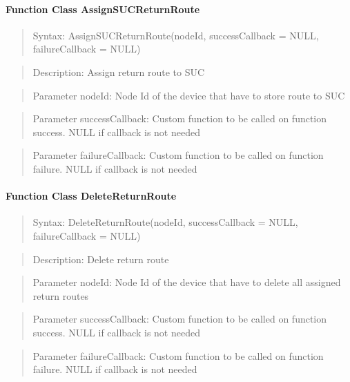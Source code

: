 \paragraph{Function Class AssignSUCReturnRoute}
\begin{quote}Syntax: AssignSUCReturnRoute(nodeId, successCallback = NULL, failureCallback = NULL)\end{quote}
\begin{quote}Description: Assign return route to SUC\end{quote}
\begin{quote}Parameter nodeId: Node Id of the device that have to store route to SUC\end{quote}
\begin{quote}Parameter successCallback: Custom function to be called on function success. NULL if callback is not needed\end{quote}
\begin{quote}Parameter failureCallback: Custom function to be called on function failure. NULL if callback is not needed\end{quote}


\paragraph{Function Class DeleteReturnRoute}
\begin{quote}Syntax: DeleteReturnRoute(nodeId, successCallback = NULL, failureCallback = NULL)\end{quote}
\begin{quote}Description: Delete return route\end{quote}
\begin{quote}Parameter nodeId: Node Id of the device that have to delete all assigned return routes\end{quote}
\begin{quote}Parameter successCallback: Custom function to be called on function success. NULL if callback is not needed\end{quote}
\begin{quote}Parameter failureCallback: Custom function to be called on function failure. NULL if callback is not needed\end{quote}


